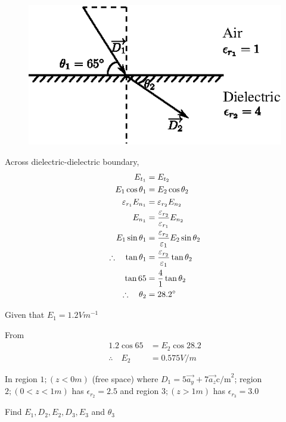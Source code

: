 \begin{solution}
~

\begin{figure}[H]
\centering
\includegraphics[scale=1.1]{images/fig5.eps}\label{chap27-fig5}
\end{figure}

Across dielectric-dielectric boundary, 
\begin{align}
E_{t_{1}} & = E_{t_{2}}\notag\\
E_{1} \cos \theta_{1} & = E_{2} \cos \theta_{2}\label{}\\
\varepsilon_{r_{1}}E_{n_{1}} & = \varepsilon_{r_{2}}E_{n_{2}}\notag\\
E_{n_{1}} & = \dfrac{\varepsilon_{r_{2}}}{\varepsilon_{r_{1}}} E_{n_{2}}\notag\\
E_{1} \sin \theta_{1} & = \dfrac{\varepsilon_{r_{2}}}{\varepsilon_{1}} E_{2} \sin \theta_{2}\label{???}\\
\therefore\quad \tan \theta_{1} & = \dfrac{\varepsilon_{r_{2}}}{\varepsilon_{1}} \tan \theta_{2}\notag\\
\tan 65 & = \dfrac{4}{1} \tan \theta_{2}\notag\\
\therefore\quad \theta_{2} & = 28.2^{\circ}\notag
\end{align}

Given that $E_{1} = 1.2 Vm^{-1}$

From 
\begin{align*}
1.2\cos 65 & = E_{2} \cos 28.2\\
\therefore\quad E_{2} & = 0.575 V/m
\end{align*}
\end{solution}


\begin{problem}
In region $1 ; (z < 0m)$ (free space) where $D_{1} = 5\overrightarrow{a_{y}} + 7\overrightarrow{a_{z}} \text{c/m}^{2}$; region $2 ; (0 < z < 1m)$ has $\epsilon_{r_{2}} = 2.5$ and region $3 ; (z > 1m)$ has $\epsilon_{r_{3}} = 3.0$

Find $E_{1}, D_{2}, E_{2}, D_{3}, E_{3}$ and $\theta_{3}$
\end{problem}

